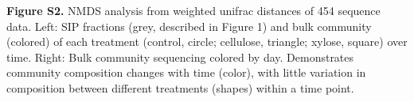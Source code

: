 \textbf{Figure S2.} NMDS analysis from weighted unifrac distances of 454 sequence data. Left: SIP fractions (grey, described in Figure 1) and bulk community (colored) of each treatment (control, circle; cellulose, triangle; xylose, square) over time. Right: Bulk community sequencing colored by day.  Demonstrates community composition changes with time (color), with little variation in composition between different treatments (shapes) within a time point.     